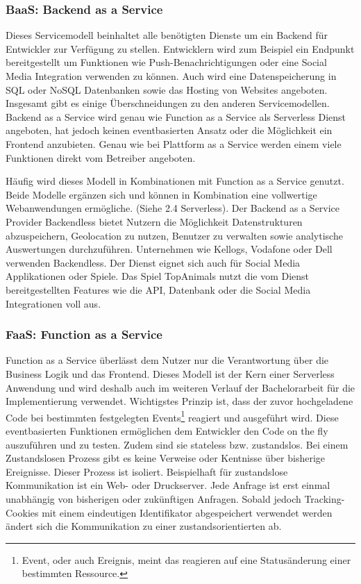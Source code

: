    \subsubsection{BaaS: Backend as a Service}
   Dieses Servicemodell beinhaltet alle benötigten Dienste um ein Backend für Entwickler zur Verfügung zu stellen.
   Entwicklern wird zum Beispiel ein Endpunkt bereitgestellt um Funktionen wie Push-Benachrichtigungen oder eine Social Media Integration verwenden zu können.
   Auch wird eine Datenspeicherung in SQL oder NoSQL Datenbanken sowie das Hosting von Websites angeboten. Insgesamt gibt es einige Überschneidungen zu den anderen Servicemodellen.
   Backend as a Service wird genau wie Function as a Service als Serverless Dienst angeboten, hat jedoch keinen eventbasierten Ansatz oder die Möglichkeit ein Frontend anzubieten.
   Genau wie bei Plattform as a Service werden einem viele Funktionen direkt vom Betreiber angeboten.

   Häufig wird dieses Modell in Kombinationen mit Function as a Service genutzt. Beide Modelle ergänzen sich und können in Kombination eine vollwertige
   Webanwendungen ermögliche. (Siehe 2.4 Serverless).
   Der Backend as a Service Provider Backendless bietet Nutzern die Möglichkeit Datenstrukturen abzuspeichern, Geolocation zu nutzen,
   Benutzer zu verwalten sowie analytische Auswertungen durchzuführen. Unternehmen wie Kellogs, Vodafone oder Dell verwenden Backendless.
   Der Dienst eignet sich auch für Social Media Applikationen oder Spiele. Das Spiel TopAnimals nutzt die vom Dienst bereitgestellten Features wie
   die API, Datenbank oder die Social Media Integrationen voll aus. \cite[]{Backendless}


   \subsubsection{FaaS: Function as a Service}
   Function as a Service überlässt dem Nutzer nur die Verantwortung über die Business Logik und das Frontend.
   Dieses Modell ist der Kern einer Serverless Anwendung und wird deshalb auch im weiteren Verlauf der Bachelorarbeit für die Implementierung
   verwendet.
   Wichtigstes Prinzip ist, dass der zuvor hochgeladene Code bei bestimmten festgelegten Events\footnote{Event, oder auch Ereignis, meint das reagieren auf eine Statusänderung einer bestimmten Ressource.} reagiert und ausgeführt wird.
   Diese eventbasierten Funktionen ermöglichen dem Entwickler den Code on the fly auszuführen und zu testen.
   Zudem sind sie stateless bzw. zustandslos. Bei einem Zustandslosen Prozess gibt es keine Verweise oder Kentnisse über bisherige Ereignisse.
   Dieser Prozess ist isoliert. Beispielhaft für zustandslose Kommunikation ist ein Web- oder Druckserver.
   Jede Anfrage ist erst einmal unabhängig von bisherigen oder zukünftigen Anfragen.
   Sobald jedoch Tracking-Cookies mit einem eindeutigen Identifikator abgespeichert verwendet werden ändert sich die Kommunikation zu einer zustandsorientierten ab.\cite[]{Zustandslos}

